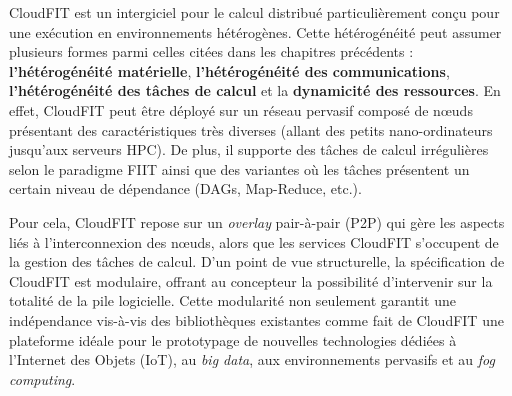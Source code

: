 

\begin{resume}
	
	CloudFIT est un intergiciel pour le calcul distribué particulièrement conçu pour une exécution en environnements hétérogènes. Cette hétérogénéité peut assumer plusieurs formes parmi celles citées dans les chapitres précédents : \textbf{l'hétérogénéité matérielle}, \textbf{l'hétérogénéité des communications},\textbf{ l'hétérogénéité des tâches de calcul} et la \textbf{dynamicité des ressources}. En effet, CloudFIT peut être déployé sur un réseau pervasif composé de n{\oe}uds présentant des caractéristiques très diverses (allant des petits nano-ordinateurs jusqu'aux serveurs HPC). De plus, il supporte des tâches de calcul irrégulières selon le paradigme FIIT ainsi que des variantes où les tâches présentent un certain niveau de dépendance (DAGs, Map-Reduce, etc.).
%	
  
	Pour cela, CloudFIT repose sur un \textit{overlay} pair-à-pair (P2P) qui gère les aspects liés à l'interconnexion des n{\oe}uds, alors que les services CloudFIT s'occupent de la gestion des tâches de calcul. D'un point de vue structurelle, la spécification de CloudFIT est modulaire, offrant au concepteur la possibilité d'intervenir sur la totalité de la pile logicielle. Cette modularité non seulement garantit une indépendance vis-à-vis des bibliothèques existantes comme fait de CloudFIT une plateforme idéale pour le prototypage de nouvelles technologies dédiées à l'Internet des Objets (IoT), au \textit{big data}, aux environnements pervasifs et au \textit{fog computing}.
	

\end{resume}
